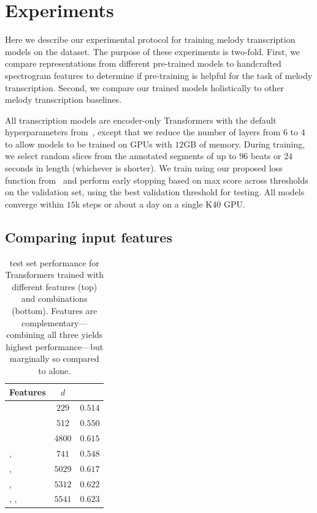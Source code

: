 \section{Experiments}
\label{sec:experiments}

Here we describe our experimental protocol for training melody transcription models on the \hooktheory{} dataset. 
The purpose of these experiments is two-fold. 
First, we compare representations from different pre-trained models to handcrafted spectrogram features to determine if pre-training is helpful for the task of melody transcription. 
Second, we compare our trained models holistically to other melody transcription baselines. 

All transcription models are encoder-only Transformers with the default hyperparameters from~\cite{vaswani2017attention}, 
except that we reduce the number of layers from $6$ to $4$ to allow models to be trained on GPUs with $12$GB of memory. 
During training, we select random slices from the annotated segments of up to $96$ beats or $24$ seconds in length (whichever is shorter). 
We train using our proposed loss function from~ and perform early stopping based on max \fone{} score across thresholds on the validation set, using the best validation threshold for testing. 
All models converge within $15$k steps or about a day on a single K40 GPU. 

\subsection{Comparing input features}
\label{sec:exp1}

\begin{table}[t]
    \centering
    \begin{tabular}{lcc}
\toprule
Features & $d$ & \fone{} \\
\midrule
\mel{} & $229$ & $0.514$ \\
\mtthree{} & $512$ & $0.550$ \\
\jukebox{} & $4800$ & $\bm{0.615}$ \\
\midrule
\mel{}, \mtthree{} & $741$ & $0.548$ \\
\mel{}, \jukebox{} & $5029$ & $0.617$ \\
\mtthree{}, \jukebox{} & $5312$ & $0.622$ \\
\mel{}, \mtthree{}, \jukebox{} & $5541$ & $\bm{0.623}$ \\
\bottomrule
    \end{tabular}
    \caption{\hooktheory{} test set performance for Transformers trained with different features (top) and combinations (bottom). Features are complementary---combining all three yields highest performance---but marginally so compared to \jukebox{} alone.}
    \label{tab:hooktheory_test}
\end{table}

